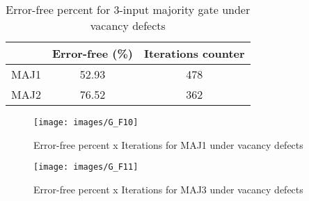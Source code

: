\begin{table}[h]
\begin{center}
\caption{Error-free percent for 3-input majority gate under vacancy defects}
\begin{tabular}{|c|c|c|}
\hline
 & Error-free (\%) & Iterations counter \\
\hline
 MAJ1 & 52.93 & 478 \\
\hline
 MAJ2 & 76.52 & 362 \\
\hline

\end{tabular}
\end{center}
\end{table}

\begin{figure}[h!]
\center
\texttt{[image: images/G\_F10]}
\caption{Error-free percent x Iterations for MAJ1 under vacancy defects}
\label{figure:majority_reg_gt5}
\end{figure}

\begin{figure}[h!]
\center
\texttt{[image: images/G\_F11]}
\caption{Error-free percent x Iterations for MAJ3 under vacancy defects}
\label{figure:majority_mod_gt5}
\end{figure}
\pagebreak